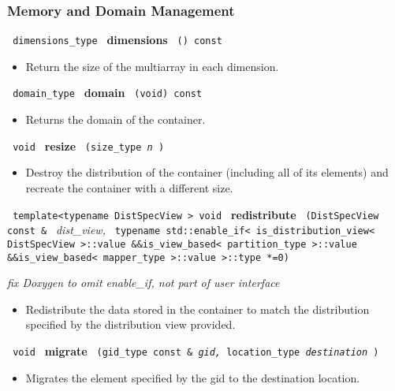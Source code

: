  
\subsubsection{Memory and Domain Management}

\noindent
\texttt{%
dimensions\_type
}
\textbf{dimensions}
\texttt{%
() const
}

\begin{itemize}
\item
Return the size of the multiarray in each dimension.
\end{itemize}
 
\noindent
\texttt{%
domain\_type 	
}
\textbf{domain}%
\texttt{%
(void) const
}

\begin{itemize}
\item
Returns the domain of the container.
\end{itemize}
 
\noindent
\texttt{%
void 
}
\textbf{resize}%
\texttt{%
(size\_type 
\textit{n}
)
}

\begin{itemize}
\item
Destroy the distribution of the container (including all of its elements) and recreate the container with a different size. 
\end{itemize}
 
\noindent
\texttt{%
template<typename DistSpecView >
void
}
\textbf{redistribute}%
\texttt{%
(DistSpecView const \&
}
\textit{dist\_view,}
\texttt{
typename std::enable\_if< is\_distribution\_view< DistSpecView >::value \&\&is\_view\_based< partition\_type >::value \&\&is\_view\_based< mapper\_type >::value >::type *=0)
}

\vspace{0.4cm} \emph{fix Doxygen to omit enable\_if, not part of user interface}

\begin{itemize}
\item
Redistribute the data stored in the container to match the distribution specified by the distribution view provided. 
\end{itemize}
 
\noindent
\texttt{%
void
}
\textbf{migrate}%
\texttt{%
(gid\_type const \&
\textit{gid,}
location\_type 
\textit{destination}
)
}

\begin{itemize}
\item
Migrates the element specified by the gid to the destination location. 
\end{itemize}
 
